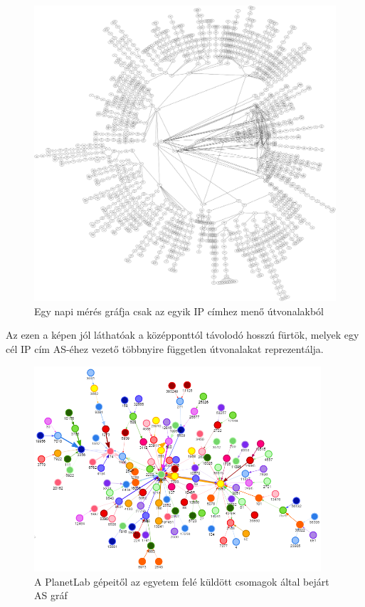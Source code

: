 \begin{figure}[!ht]
	\centering
	\includegraphics[width=1\textwidth, keepaspectratio]{figures/graph.png}
	\caption{Egy napi mérés gráfja csak az egyik IP címhez menő útvonalakból\label{fig:graph}}
\end{figure}

Az ezen a képen jól láthatóak a középponttól távolodó hosszú fürtök, melyek egy cél IP cím AS-éhez vezető többnyire független útvonalakat reprezentálja.

\begin{figure}[h]
	\centering
	\includegraphics[width=0.95\textwidth, keepaspectratio]{figures/as-graph.png}
	\caption{A PlanetLab gépeitől az egyetem felé küldött csomagok által bejárt AS gráf}
	\label{fig:as-graph}
\end{figure}

